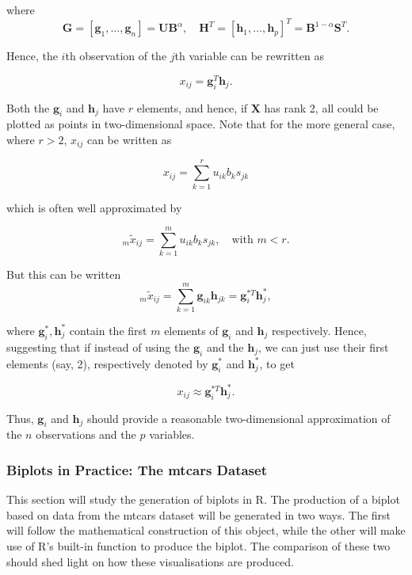 \documentclass{article}\usepackage[]{graphicx}\usepackage[]{xcolor}
\numberwithin{equation}{section}
\begin{document}
{\noindent where \[\mathbf{G} = [\mathbf{g}_1, \dots , \mathbf{g}_n] = \mathbf{U}\mathbf{B}^\alpha, \quad \mathbf{H}^T = [\mathbf{h}_1, \dots , \mathbf{h}_p]^T = \mathbf{B}^{1-\alpha}\mathbf{S}^T. \]

\noindent Hence, the $i$th observation of the $j$th variable can be rewritten as

\[ x_{ij} = \mathbf{g}_i^T \mathbf{h}_j. \]

\noindent Both the $\mathbf{g}_i$ and $\mathbf{h}_j$ have $r$ elements, and hence, if $\mathbf{X}$ has rank 2, all could be plotted as points in two-dimensional space. Note that for the more general case, where $r > 2$, $x_{ij}$ can be written as

\[
x_{ij} = \sum_{k=1}^{r} u_{ik}b_{k}s_{jk}
\]

\noindent which is often well approximated by

\[
_m\tilde{x}_{ij} = \sum_{k=1}^{m} u_{ik}b_{k}s_{jk}, \quad \text{with } m < r.
\]

\noindent But this can be written
\[
_m\tilde{x}_{ij} = \sum_{k=1}^{m} \mathbf{g}_{ik}\mathbf{h}_{jk} = \mathbf{g}_{i}^{*T}\mathbf{h}_{j}^{*},
\]

\noindent where $\mathbf{g}^*_{i}, \mathbf{h}^*_{j}$ contain the first $m$ elements of $\mathbf{g}_i$ and $\mathbf{h}_j$ respectively. Hence, suggesting that if instead of using the $\mathbf{g}_i$ and the $\mathbf{h}_j$, we can just use their first elements (say, 2), respectively denoted by  $\mathbf{g}_{i}^{*}$  and  $\mathbf{h}_{j}^{*}$, to get

\[ x_{ij} \approx \mathbf{g}_{i}^{*T}\mathbf{h}_{j}^{*}.\]

\noindent Thus, $\mathbf{g}_i$ and $\mathbf{h}_j$ should provide a reasonable two-dimensional approximation of the $n$ observations and the $p$ variables.\\

\subsubsection{Biplots in Practice: The mtcars Dataset}

\noindent This section will study the generation of biplots in R. The production of a biplot based on data from the mtcars dataset will be generated in two ways. The first will follow the mathematical construction of this object, while the other will make use of R's built-in function to produce the biplot. The comparison of these two should shed light on how these visualisations are produced. 

}
\end{document}
